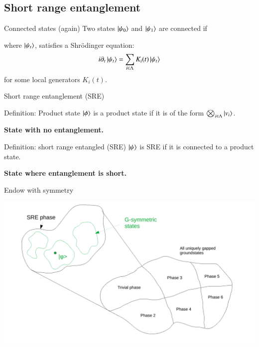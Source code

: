 \documentclass{beamer}
\begin{document}
\subsection{Short range entanglement}

\begin{frame}{Connected states (again)}
	Two states $\ket{\psi_0}$ and $\ket{\psi_1}$ are connected if
	\begin{center}
	\end{center}
	where $\ket{\psi_t}$, satisfies a Shr\"odinger equation:
	\[i\partial_t\ket{\psi_t}=\sum_{i\in\Lambda} K_{i}(t) \ket{\psi_t}\]
	for some local generators $K_i(t)$.
\end{frame}

\begin{frame}{Short range entanglement (SRE)}
	
	\begin{block}{Definition: Product state}
		$\ket{\phi}$ is a product state if it is of the form $\bigotimes_{i\in\Lambda}\ket{v_i}$.
	\end{block}
	\pause
	\textbf{State with no entanglement.}
	\pause
	\begin{block}{Definition: short range entangled (SRE)}
		$\ket{\psi}$ is SRE if it is connected to a product state.
	\end{block}
	\pause
	\textbf{State where entanglement is short.}
\end{frame}

\begin{frame}{Endow with symmetry}
	\begin{center}
		\includegraphics[width=\textwidth]{Images/G-invariant_Parts_Of_SRE_Phase.pdf}
	\end{center}
\end{frame}
\end{document}
